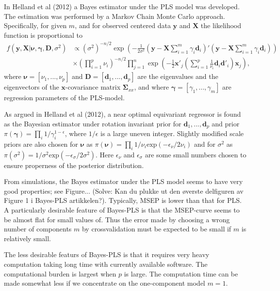 \documentclass[11pt]{article}
\begin{document}
In Helland et al (2012) a Bayes estimator under the PLS model was developed. The estimation was performed by a Markov Chain Monte Carlo approach. Specifically, for given $m$, and for observed centered data $\bm{y}$ and $\bm{X}$ the likelihood function is proportional to
\begin{equation} \label{likelihood}
    \begin{split}
        f(\bm{y},\bm{X}|\bm{\nu}, \bm{\gamma}, \bm{D},\sigma^2) &\propto (\sigma^2)^{-n/2}
        \exp\left(-\frac{1}{2\sigma^2}(\bm{y}-\bm{X}\sum_{i=1}^{m}\gamma_i \bm{d}_i)'(\bm{y}-\bm{X}\sum_{i=1}^{m}\gamma_i \bm{d}_i)\right)\\
        &\times (\prod_{i=1}^{p}\nu_i)^{-n/2}\prod_{j=1}^{n}\exp\left(-\frac{1}{2} \bm{x}'_j(\sum_{i=1}^{p}\frac{1}{\nu_i}\bm{d}_i \bm{d}'_i)\bm{x}_j  \right),
    \end{split}
\end{equation}
where $\bm{\nu}=[\nu_1,...,\nu_p]$ and $\bm{D}=[\bm{d}_1,...,\bm{d}_p]$ are the eigenvalues and the eigenvectors of the $\bm{x}$-covariance matrix $\bm{\Sigma}_{xx}$, and where $\bm{\gamma}=[\gamma_1,...,\gamma_m]$ are regression parameters of the PLS-model.

As argued in Helland et al (2012), a near optimal equivariant regressor is found as the Bayesian estimator under rotation invariant prior for $\bm{d}_1,...,\bm{d}_p$ and prior $\pi(\bm{\gamma})=\prod_i 1/\gamma_i^{1-\epsilon}$, where $1/\epsilon$ is a large uneven integer. Slightly modified scale priors are also chosen for $\bm{\nu}$ as $\pi(\bm{\nu}) =\prod_i 1/\nu_i \mathrm{exp}(-\epsilon_\nu/2\nu_i)$ and for $\sigma^2$ as $\pi(\sigma^2)=1/\sigma^2\mathrm{exp}(-\epsilon_\sigma/2\sigma^2)$. Here $\epsilon_\nu$ and $\epsilon_\sigma$ are some small numbers chosen to ensure properness of the posterior distribution.

From simulations, the Bayes estimator under the PLS model seems to have very good properties; see Figure... (Solve: Kan du plukke ut den \o verste delfiguren av Figure 1 i Bayes-PLS artikkelen?). Typically, MSEP is lower than that for PLS. A particularly desirable feature of Bayes-PLS is that the MSEP-curve seems to be almost flat for small values of. Thus the error made by choosing a wrong number of components $m$ by crossvalidation must be expected to be small if $m$ is relatively small.

The less desirable featurs of Bayes-PLS is that it requires very heavy computation taking long time with currently available software. The computational burden is largest when $p$ is large. The computation time can be made somewhat  less if we concentrate on the one-component model $m=1$.
\end{document}
